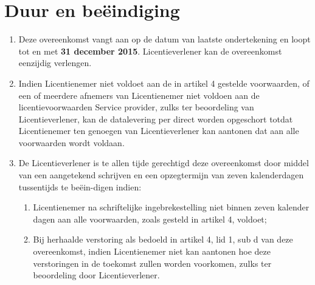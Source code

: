\documentclass[10pt, a4paper]{article}
\begin{document}
\section{Duur en beëindiging}
\begin{enumerate}
\item Deze overeenkomst vangt aan op de datum van laatste ondertekening en loopt tot en met \textbf{31 december 2015}. Licentieverlener kan de overeenkomst eenzijdig verlengen.
\item Indien Licentienemer niet voldoet aan de in artikel 4 gestelde voorwaarden, of een of meerdere afnemers van Licentienemer niet voldoen aan de licentievoorwaarden Service provider, zulks ter beoordeling van Licentieverlener, kan de datalevering per direct worden opgeschort totdat Licentienemer ten genoegen van Licentieverlener kan aantonen dat aan alle voorwaarden wordt voldaan.
\item De Licentieverlener is te allen tijde gerechtigd deze overeenkomst door middel van een aangetekend schrijven en een opzegtermijn van zeven kalenderdagen tussentijds te beëin-digen indien:
\begin{enumerate}
\item Licentienemer na schriftelijke ingebrekestelling niet binnen zeven kalender dagen aan alle voorwaarden, zoals gesteld in artikel 4, voldoet;
\item Bij herhaalde verstoring als bedoeld in artikel 4, lid 1, sub d van deze overeenkomst, indien Licentienemer niet kan aantonen hoe deze verstoringen in de toekomst zullen worden voorkomen, zulks ter beoordeling door Licentieverlener.
\end{enumerate}
\end{enumerate}
\end{document}
